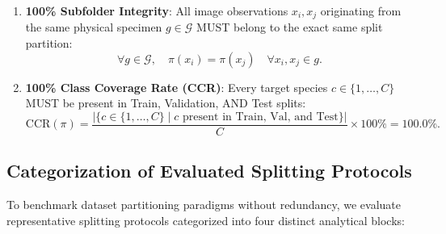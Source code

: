 \begin{tcolorbox}[colback=lightbg,colframe=primaryblue,title=\textbf{SCDP Core Data Governance Axioms}]
\begin{enumerate}[leftmargin=*]
\item \textbf{100\% Subfolder Integrity}: All image observations $x_i, x_j$ originating from the same physical specimen $g \in \mathcal{G}$ MUST belong to the exact same split partition:
\begin{equation}
\forall g \in \mathcal{G}, \quad \pi(x_i) = \pi(x_j) \quad \forall x_i, x_j \in g.
\label{eq:subfolder_integrity}
\end{equation}
\item \textbf{100\% Class Coverage Rate (CCR)}: Every target species $c \in \{1, \dots, C\}$ MUST be present in Train, Validation, AND Test splits:
\begin{equation}
\mathrm{CCR}(\pi) = \frac{|\{c \in \{1,\dots,C\} \mid c \text{ present in Train, Val, and Test}\}|}{C} \times 100\% = 100.0\%.
\end{equation}
\end{enumerate}
\end{tcolorbox}

\subsection{Categorization of Evaluated Splitting Protocols}
To benchmark dataset partitioning paradigms without redundancy, we evaluate representative splitting protocols categorized into four distinct analytical blocks:

